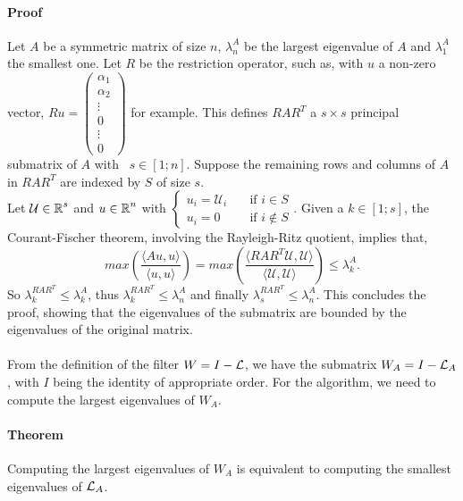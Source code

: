 \paragraph{Proof}
Let \(A\) be a symmetric matrix of size \(n\), \(\lambda^A_n\) be the largest eigenvalue of \(A\) and \(\lambda^A_1\) the smallest one.
Let \(R\) be the restriction operator, such as, with \(u\) a non-zero vector, \(Ru = \begin{pmatrix}\alpha_1 \\ \alpha_2 \\ \vdots \\ 0 \\ \vdots \\ 0 \end{pmatrix}\) for example.
This defines \(RAR^T\) a \(s \times s\) principal submatrix of \(A\) with  \(s \in [1; n]\).
Suppose the remaining rows and columns of \(A\) in \(RAR^T\) are indexed by \(S\) of size \(s\). \\
Let \(\mathcal{U} \in \operatorname{\mathbb{R}}^s\) and \(u \in \operatorname{\mathbb{R}}^n\) with \(\begin{cases} u_i = \mathcal{U}_i & \quad \text{if } i \in S \\ u_i = 0 & \quad \text{if } i \notin S \end{cases}\).
Given a \(k \in [1; s]\), the Courant-Fischer theorem, involving the Rayleigh-Ritz quotient, implies that,
\[max\left(\frac{\langle Au, u \rangle}{\langle u, u\rangle}\right) = max\left(\frac{\langle RAR^T\mathcal{U}, \mathcal{U}\rangle}{\langle \mathcal{U}, \mathcal{U} \rangle}\right) \le \lambda^A_k.\]
So \(\lambda^{RAR^T}_k \le \lambda^A_k\), thus \(\lambda^{RAR^T}_k \le \lambda^A_n\) and finally \(\lambda^{RAR^T}_s \le \lambda^A_n\).
This concludes the proof, showing that the eigenvalues of the submatrix are bounded by the eigenvalues of the original matrix.

\paragraph{}
From the definition of the filter \(W = I - \operatorname{\mathcal{L}}\), we have the submatrix \(W_A = I - \operatorname{\mathcal{L}}_A\), with \(I\) being the identity of appropriate order.
For the algorithm, we need to compute the largest eigenvalues of \(W_A\).

\paragraph{Theorem}
Computing the largest eigenvalues of \(W_A\) is equivalent to computing the smallest eigenvalues of \(\operatorname{\mathcal{L}}_A\).

